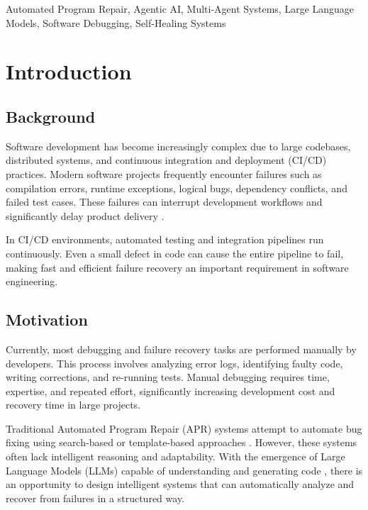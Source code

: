 \documentclass[conference]{IEEEtran}
\begin{document}
\begin{IEEEkeywords}
Automated Program Repair, Agentic AI, Multi-Agent Systems, Large Language Models, Software Debugging, Self-Healing Systems
\end{IEEEkeywords}

\section{Introduction}

\subsection{Background}
Software development has become increasingly complex due to large codebases, distributed systems, and continuous integration and deployment (CI/CD) practices. Modern software projects frequently encounter failures such as compilation errors, runtime exceptions, logical bugs, dependency conflicts, and failed test cases. These failures can interrupt development workflows and significantly delay product delivery \cite{genprog}.

In CI/CD environments, automated testing and integration pipelines run continuously. Even a small defect in code can cause the entire pipeline to fail, making fast and efficient failure recovery an important requirement in software engineering.

\subsection{Motivation}
Currently, most debugging and failure recovery tasks are performed manually by developers. This process involves analyzing error logs, identifying faulty code, writing corrections, and re-running tests. Manual debugging requires time, expertise, and repeated effort, significantly increasing development cost and recovery time in large projects.

Traditional Automated Program Repair (APR) systems attempt to automate bug fixing using search-based or template-based approaches \cite{genprog, templateapr}. However, these systems often lack intelligent reasoning and adaptability. With the emergence of Large Language Models (LLMs) capable of understanding and generating code \cite{codex, gemini}, there is an opportunity to design intelligent systems that can automatically analyze and recover from failures in a structured way.
\end{document}
